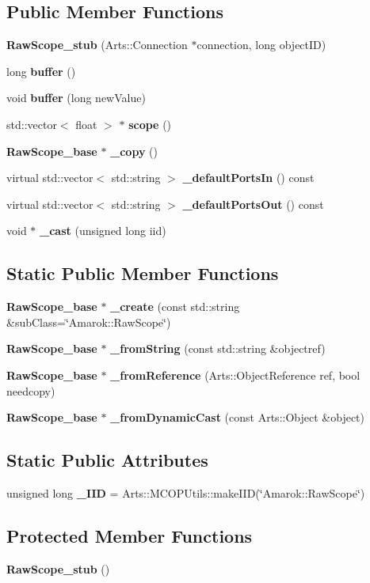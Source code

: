 \subsection*{Public Member Functions}
\begin{CompactItemize}
\item 
{\bf Raw\-Scope\_\-stub} (Arts::Connection $\ast$connection, long object\-ID)
\item 
long {\bf buffer} ()
\item 
void {\bf buffer} (long new\-Value)
\item 
std::vector$<$ float $>$ $\ast$ {\bf scope} ()
\item 
{\bf Raw\-Scope\_\-base} $\ast$ {\bf \_\-copy} ()
\item 
virtual std::vector$<$ std::string $>$ {\bf \_\-default\-Ports\-In} () const 
\item 
virtual std::vector$<$ std::string $>$ {\bf \_\-default\-Ports\-Out} () const 
\item 
void $\ast$ {\bf \_\-cast} (unsigned long iid)
\end{CompactItemize}
\subsection*{Static Public Member Functions}
\begin{CompactItemize}
\item 
{\bf Raw\-Scope\_\-base} $\ast$ {\bf \_\-create} (const std::string \&sub\-Class=\char`\"{}Amarok::Raw\-Scope\char`\"{})
\item 
{\bf Raw\-Scope\_\-base} $\ast$ {\bf \_\-from\-String} (const std::string \&objectref)
\item 
{\bf Raw\-Scope\_\-base} $\ast$ {\bf \_\-from\-Reference} (Arts::Object\-Reference ref, bool needcopy)
\item 
{\bf Raw\-Scope\_\-base} $\ast$ {\bf \_\-from\-Dynamic\-Cast} (const Arts::Object \&object)
\end{CompactItemize}
\subsection*{Static Public Attributes}
\begin{CompactItemize}
\item 
unsigned long {\bf \_\-IID} = Arts::MCOPUtils::make\-IID(\char`\"{}Amarok::Raw\-Scope\char`\"{})
\end{CompactItemize}
\subsection*{Protected Member Functions}
\begin{CompactItemize}
\item 
{\bf Raw\-Scope\_\-stub} ()
\end{CompactItemize}


